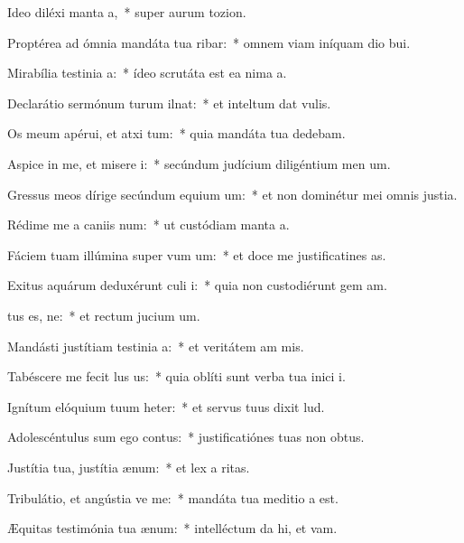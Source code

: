 \item Ideo diléxi manta a,~* super aurum  tozion.
\item Proptérea ad ómnia mandáta tua ribar:~* omnem viam iníquam dio bui.
\item Mirabília testinia a:~* ídeo scrutáta est ea nima a.
\item Declarátio sermónum turum ilnat:~* et inteltum dat vulis.
\item Os meum apérui, et atxi tum:~* quia mandáta tua dedebam.
\item Aspice in me, et misere i:~* secúndum judícium diligéntium men um.
\item Gressus meos dírige secúndum equium um:~* et non dominétur mei omnis justia.
\item Rédime me a caniis num:~* ut custódiam manta a.
\item Fáciem tuam illúmina super vum um:~* et doce me justificatines as.
\item Exitus aquárum deduxérunt culi i:~* quia non custodiérunt gem am.
\item {}tus es, ne:~* et rectum jucium um.
\item Mandásti justítiam testinia a:~* et veritátem am mis.
\item Tabéscere me fecit lus us:~* quia oblíti sunt verba tua inici i.
\item Ignítum elóquium tuum heter:~* et servus tuus dixit lud.
\item Adolescéntulus sum ego  contus:~* justificatiónes tuas non  obtus.
\item Justítia tua, justítia  ænum:~* et lex a ritas.
\item Tribulátio, et angústia ve me:~* mandáta tua meditio a est.
\item Æquitas testimónia tua  ænum:~* intelléctum da hi, et vam.
